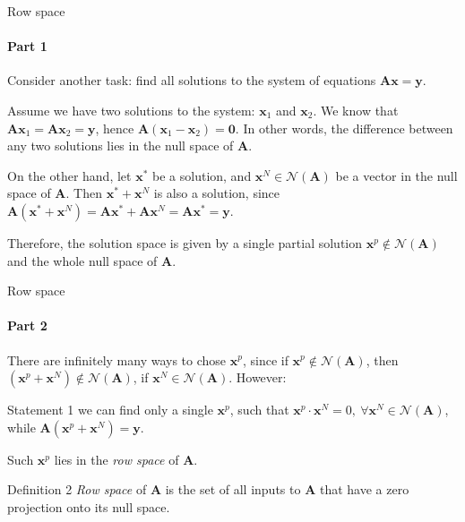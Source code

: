 \documentclass{beamer}
\begin{document}
\begin{frame}{Row space}
\framesubtitle{Part 1}
\begin{flushleft}

Consider another task: find all solutions to the system of equations $\mathbf{A} \mathbf{x} = \mathbf{y}$.

\bigskip

Assume we have two solutions to the system: $\mathbf{x}_1$ and $\mathbf{x}_2$. We know that $\mathbf{A} \mathbf{x}_1 = \mathbf{A} \mathbf{x}_2= \mathbf{y}$, hence $\mathbf{A} (\mathbf{x}_1 - \mathbf{x}_2) = \mathbf{0}$. In other words, the difference between any two solutions lies in the null space of $\mathbf{A}$.

\bigskip

On the other hand, let $\mathbf{x}^*$ be a solution, and $\mathbf{x}^N \in \mathcal{N}(\mathbf{A})$ be a vector in the null space of $\mathbf{A}$. Then $\mathbf{x}^* + \mathbf{x}^N$ is also a solution, since $\mathbf{A} (\mathbf{x}^* + \mathbf{x}^N) = \mathbf{A} \mathbf{x}^* + \mathbf{A} \mathbf{x}^N = \mathbf{A} \mathbf{x}^* = \mathbf{y}$.

\bigskip

Therefore, the solution space is given by a single partial solution $\mathbf{x}^p \notin \mathcal{N}(\mathbf{A})$ and the whole null space of $\mathbf{A}$.

\end{flushleft}
\end{frame}


\begin{frame}{Row space}
\framesubtitle{Part 2}
\begin{flushleft}

There are infinitely many ways to chose $\mathbf{x}^p$, since if $\mathbf{x}^p \notin \mathcal{N}(\mathbf{A})$, then $(\mathbf{x}^p + \mathbf{x}^N) \notin \mathcal{N}(\mathbf{A})$, if $\mathbf{x}^N \in \mathcal{N}(\mathbf{A})$. However: 

\begin{block}{Statement 1}
we can find only a single $\mathbf{x}^p$, such that $\mathbf{x}^p \cdot \mathbf{x}^N = 0, \ \forall \mathbf{x}^N \in \mathcal{N}(\mathbf{A})$, while $\mathbf{A} (\mathbf{x}^p + \mathbf{x}^N) = \mathbf{y}$.
\end{block}

\bigskip

Such $\mathbf{x}^p$ lies in the \emph{row space} of $\mathbf{A}$. 

\begin{block}{Definition 2}
\emph{Row space} of $\mathbf{A}$ is the set of all inputs to $\mathbf{A}$ that have a zero projection onto its null space.
\end{block}

\end{flushleft}
\end{frame}
\end{document}
